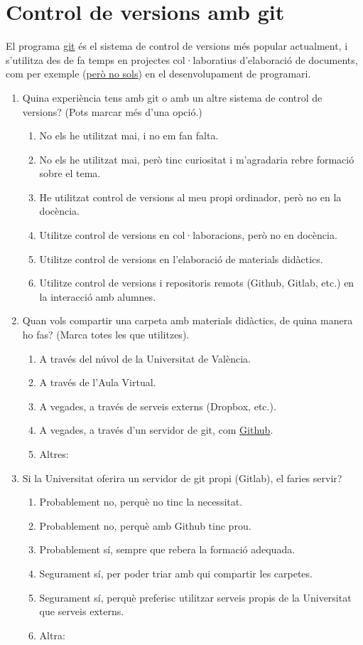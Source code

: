 \documentclass[a4paper,12pt]{article}
\begin{document}
\section{Control de versions amb \textsf{git}}
El programa \href{https://git-scm.com/}{git} és el sistema de control de versions més popular
actualment, i s'utilitza des de fa temps en projectes col·laboratius d'elaboració de documents,
com per exemple (\href{https://doi.org/10.1111/2041-210X.14108}{però no sols}) en el desenvolupament de programari.
\begin{enumerate}
\item Quina experiència tens amb git o amb un altre sistema de control de versions? (Pots marcar més d'una opció.)
   \begin{enumerate}
   \item No els he utilitzat mai, i no em fan falta.
   \item No els he utilitzat mai, però tinc curiositat i m'agradaria rebre formació sobre el tema.
   \item He utilitzat control de versions al meu propi ordinador, però no en la docència.
   \item Utilitze control de versions en col·laboracions, però no en docència.
   \item Utilitze control de versions en l'elaboració de materials didàctics.
   \item Utilitze control de versions i repositoris remots (Github, Gitlab, etc.) en la interacció amb alumnes.
   \end{enumerate}

\item Quan vols compartir una carpeta amb materials didàctics, de quina manera ho fas? (Marca totes les que utilitzes).
   \begin{enumerate}
   \item A través del núvol de la Universitat de València.
   \item A través de l'Aula Virtual.
   \item A vegades, a través de serveis externs (Dropbox, etc.).
   \item A vegades, a través d'un servidor de git, com \href{https://github.com/}{Github}.
   \item Altres:
   \end{enumerate}

\item Si la Universitat oferira un servidor de \textsf{git} propi (Gitlab), el faries servir?
   \begin{enumerate}
   \item Probablement no, perquè no tinc la necessitat.
   \item Probablement no, perquè amb Github tinc prou.
   \item Probablement sí, sempre que rebera la formació adequada.
   \item Segurament sí, per poder triar amb qui compartir les carpetes.
   \item Segurament sí, perquè preferisc utilitzar serveis propis de la Universitat que serveis externs.
   \item Altra:
   \end{enumerate}
\end{enumerate}
\end{document}
